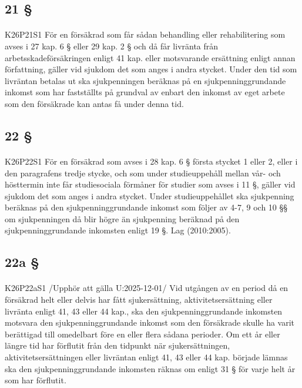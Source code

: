 \documentclass[a4paper,notitlepage,openany,10pt]{book}
\begin{document}
\subsection*{21 §}
\paragraph*{}
{\tiny K26P21S1}
För en försäkrad som får sådan behandling eller rehabilitering som avses i 27 kap. 6 § eller 29 kap. 2 § och då får livränta från arbetsskadeförsäkringen enligt 41 kap.
eller motsvarande ersättning enligt annan författning, gäller vid sjukdom det som anges i andra stycket.
Under den tid som livräntan betalas ut ska sjukpenningen beräknas på en sjukpenninggrundande inkomst som har fastställts på grundval av enbart den inkomst av eget arbete som den försäkrade kan antas få under denna tid.
\subsection*{22 §}
\paragraph*{}
{\tiny K26P22S1}
För en försäkrad som avses i 28 kap. 6 § första stycket 1 eller 2, eller i den paragrafens tredje stycke, och som under studieuppehåll mellan vår- och hösttermin inte får studiesociala förmåner för studier som avses i 11 §, gäller vid sjukdom det som anges i andra stycket.
Under studieuppehållet ska sjukpenning beräknas på den sjukpenninggrundande inkomst som följer av 4-7, 9 och 10 §§ om sjukpenningen då blir högre än sjukpenning beräknad på den sjukpenninggrundande inkomsten enligt 19 §.
Lag (2010:2005).
\subsection*{22a §}
\paragraph*{}
{\tiny K26P22aS1}
/Upphör att gälla U:2025-12-01/
Vid utgången av en period då en försäkrad helt eller delvis har fått sjukersättning, aktivitetsersättning eller livränta enligt 41, 43 eller 44 kap., ska den sjukpenninggrundande inkomsten motsvara den sjukpenninggrundande inkomst som den försäkrade skulle ha varit berättigad till omedelbart före en eller flera sådana perioder. Om ett år eller längre tid har förflutit från den tidpunkt när sjukersättningen, aktivitetsersättningen eller livräntan enligt 41, 43 eller 44 kap. började lämnas ska den sjukpenninggrundande inkomsten räknas om enligt 31 § för varje helt år som har förflutit.
\end{document}
